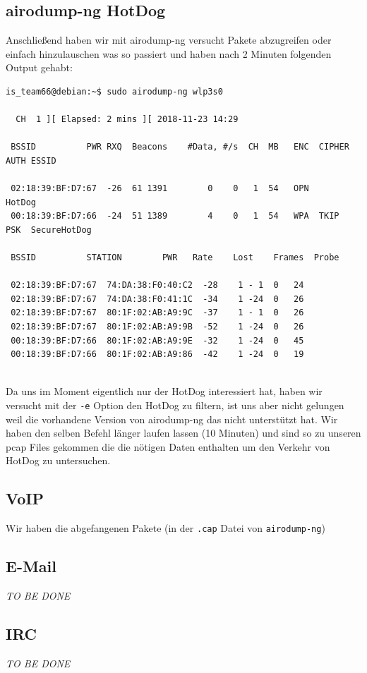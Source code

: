 \documentclass[12pt,a4paper,titlepage,oneside]{scrartcl}
\begin{document}
\subsection{airodump-ng HotDog}
Anschließend haben wir mit airodump-ng versucht Pakete abzugreifen oder einfach hinzulauschen was so passiert und haben nach 2 Minuten folgenden Output gehabt:

\begin{lstlisting}
is_team66@debian:~$ sudo airodump-ng wlp3s0

  CH  1 ][ Elapsed: 2 mins ][ 2018-11-23 14:29

 BSSID		    PWR RXQ  Beacons	#Data, #/s  CH	MB   ENC  CIPHER AUTH ESSID

 02:18:39:BF:D7:67  -26  61	1391	    0	 0   1	54   OPN	      HotDog
 00:18:39:BF:D7:66  -24  51	1389	    4	 0   1	54   WPA  TKIP	 PSK  SecureHotDog

 BSSID		    STATION	       PWR   Rate    Lost    Frames  Probe

 02:18:39:BF:D7:67  74:DA:38:F0:40:C2  -28    1 - 1	 0	 24
 02:18:39:BF:D7:67  74:DA:38:F0:41:1C  -34    1 -24	 0	 26
 02:18:39:BF:D7:67  80:1F:02:AB:A9:9C  -37    1 - 1	 0	 26
 02:18:39:BF:D7:67  80:1F:02:AB:A9:9B  -52    1 -24	 0	 26
 00:18:39:BF:D7:66  80:1F:02:AB:A9:9E  -32    1 -24	 0	 45
 00:18:39:BF:D7:66  80:1F:02:AB:A9:86  -42    1 -24	 0	 19
 
\end{lstlisting}

Da uns im Moment eigentlich nur der HotDog interessiert hat, haben wir versucht mit der \lstinline{-e} Option den HotDog zu filtern, ist uns aber nicht gelungen weil die vorhandene Version von airodump-ng das nicht unterstützt hat.
Wir haben den selben Befehl länger laufen lassen (10 Minuten) und sind so zu unseren pcap Files gekommen die die nötigen Daten enthalten um den Verkehr von HotDog zu untersuchen.

\subsection{VoIP}

Wir haben die abgefangenen Pakete (in der \lstinline{.cap} Datei von \lstinline{airodump-ng})

\subsection{E-Mail}
\emph{TO BE DONE}

\subsection{IRC}
\emph{TO BE DONE}
\end{document}
